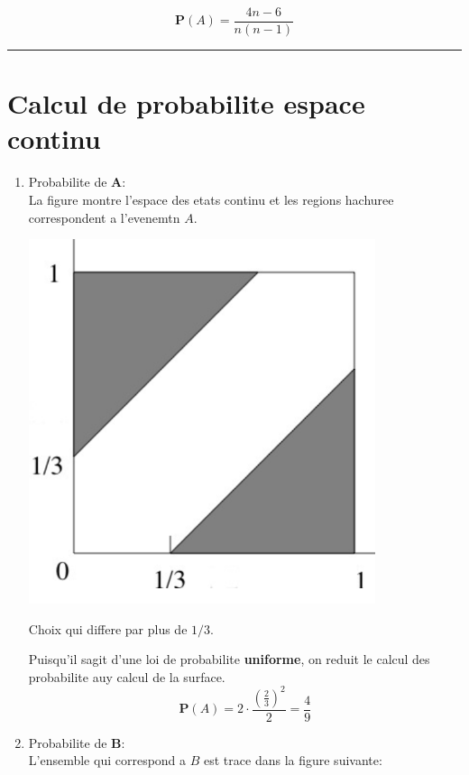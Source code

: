 \documentclass[a4paper]{tufte-handout}
\begin{document}
\begin{equation*}
  \mathbf{P}(A) = \frac{4n-6}{n(n-1)}
\end{equation*}



\hrule


\section{Calcul de probabilite espace continu}

\begin{enumerate}
  \item Probabilite de $\mathbf{A}$:\\
La figure montre l'espace des etats continu et les regions hachuree
correspondent a l'evenemtn $A$.
\begin{marginfigure}
  \centering
  \includegraphics[width=0.8\textwidth]{figures/exo2_1.png}
  \caption{Choix qui differe par plus de $1/3$.}
\end{marginfigure}
Puisqu'il sagit d'une loi de probabilite \textbf{uniforme}, on reduit le calcul
des probabilite auy calcul de la surface.
\begin{equation*}
  \mathbf{P}(A) = 2\cdot \frac{\left(\frac{2}{3}\right)^2}{2} = \frac{4}{9}
\end{equation*}
\item Probabilite de $\mathbf{B}$:\\
  L'ensemble qui correspond a $B$ est trace dans la figure suivante:


\end{enumerate}
\end{document}
